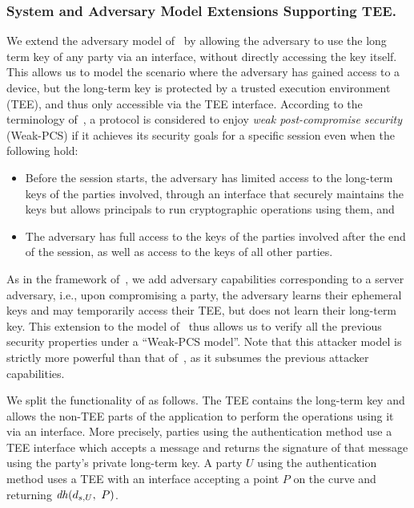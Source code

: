 \documentclass[runningheads]{llncs}
\begin{document}
\subsubsection{System and Adversary Model Extensions Supporting TEE.}
\label{sec:TEE:advModel}
%
We extend the adversary model of~\cite{Norr21} by allowing the adversary to 
use the long term key of any party via an interface, without directly accessing 
the key itself.
%
This allows us to model the scenario where the adversary has gained access to
a device, but the long-term key is protected by a trusted execution
environment (TEE), and thus only accessible via the TEE interface.
%
According to the terminology of~\cite{DBLP:conf/csfw/Cohn-GordonCG16}, a
protocol is considered to enjoy \emph{weak post-compromise security}
(Weak-PCS) if it achieves its security goals for a specific session
even when the following hold:
\begin{itemize}
\item Before the session starts, the adversary has limited access to the 
long-term 
keys of the parties involved, through an interface that securely maintains 
the keys but allows principals to run cryptographic operations using them, and
\item The adversary has full access to the keys of the parties involved after the 
end of the session, as well as access to the keys of all other parties.
\end{itemize}
%
As in the framework of~\cite{DBLP:conf/icics/XuZRWTZ20}, we add 
adversary
capabilities corresponding to a server adversary, i.e., upon 
compromising a party, the adversary learns their ephemeral keys and may temporarily access their TEE, but does not learn their long-term key.
%
This extension to the model of~\cite{Norr21} thus allows us to verify all the
previous security properties under a ``Weak-PCS model''.
%
Note that this attacker model is strictly more powerful than that 
of~\cite{Norr21}, as it subsumes the previous attacker capabilities.
%

We split the functionality of \mEdhoc{} as follows.
%
The TEE contains the long-term key and allows the non-TEE parts of the
application to perform the operations using it via an interface.
%
More precisely, parties using the \mSig{} authentication method use a TEE 
interface which accepts a message and returns the signature of that 
message using the party's private long-term key.
%
A party $U$ using the \mStat{} authentication method uses a TEE with an 
interface accepting a point $P$ on the curve and 
returning $\mDH(\mPriv{U},\ P)$.
%
\end{document}
